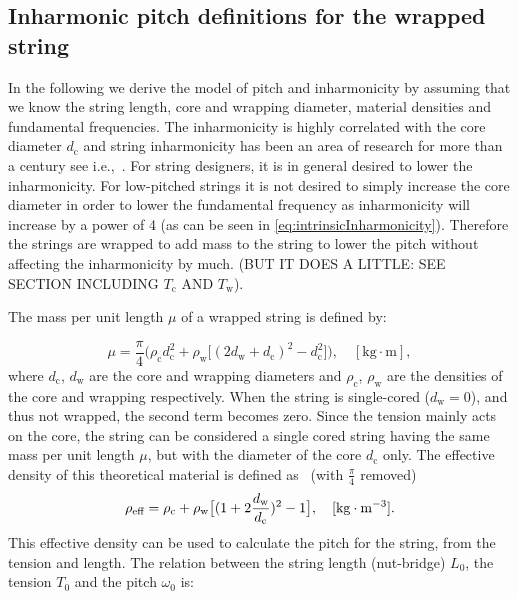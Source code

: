 \documentclass{article}
\begin{document}
\begin{sloppy}
\subsection{Inharmonic pitch definitions for the wrapped string %
}

In the following we derive the model of pitch and inharmonicity by assuming that we know the string length, core and wrapping diameter,  material densities and fundamental frequencies. The inharmonicity is highly correlated with the core diameter $d_\text{c}$ and string inharmonicity has been an area of research for more than a century see i.e.,~\cite{rayleigh:sound}. For string designers, it is in general desired to lower the inharmonicity. For low-pitched strings it is not desired to simply increase the core diameter in order to lower the fundamental frequency as inharmonicity will increase by a power of 4 (as can be seen in \eqref{eq:intrinsicInharmonicity}). Therefore the strings are wrapped to add mass to the string to lower the pitch without affecting the inharmonicity by much. (BUT IT DOES A LITTLE: SEE SECTION INCLUDING $T_\text{c}$ AND $T_\text{w}$).

\noindent The mass per unit length $\mu$ of a wrapped string is defined by:

\begin{equation}
    \mu = \frac{\pi}{4}\Big(\rho_\text{c}d_\text{c}^2 + \rho_\text{w}\big[(2d_\text{w}+d_\text{c})^2-d_\text{c}^2\big]\Big), \quad [\text{kg}\cdot\text{m}],
\end{equation}
where $d_\text{c}$, $d_\text{w}$ are the core and wrapping diameters and $\rho_\text{c}$, $\rho_\text{w}$ are the densities of the core and wrapping respectively. When the string is single-cored ($d_\text{w} = 0$), and thus not wrapped, the second term becomes zero. Since the tension mainly acts on the core, the string can be considered a single cored string having the same mass per unit length $\mu$, but with the diameter of the core $d_\text{c}$ only. The effective density of this theoretical material is defined as~\cite{firth:string_design} (with $\frac{\pi}{4}$ removed)
\begin{equation}
    \rho_{\textup{eff}} = \rho_\text{c} + \rho_\text{w} \big[(1+2\frac{d_\text{w}}{d_\text{c}})^2-1\big], \quad [\text{kg}\cdot\text{m}^{-3}].
\end{equation}
This effective density can be used to calculate the pitch for the string, from the tension and length. The relation between the string length (nut-bridge) $L_0$, the tension $T_0$ and the pitch $\omega_0$ is:


\end{sloppy}
\end{document}
